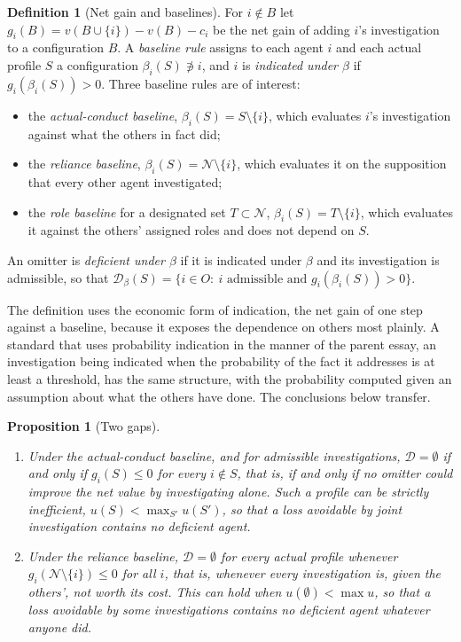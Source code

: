 \documentclass[11pt]{article}
\newcommand{\N}{\mathcal N}
\newcommand{\Dfc}{\mathcal D}
\theoremstyle{plain}
\newtheorem{proposition}{Proposition}
\theoremstyle{definition}
\newtheorem{definition}{Definition}
\begin{document}
\begin{definition}[Net gain and baselines]\label{def:baseline}
For $i\notin B$ let $g_i(B)=v(B\cup\{i\})-v(B)-c_i$ be the net gain of adding $i$'s investigation to a configuration $B$. A \emph{baseline rule} assigns to each agent $i$ and each actual profile $S$ a configuration $\beta_i(S)\not\ni i$, and $i$ is \emph{indicated under $\beta$} if $g_i(\beta_i(S))>0$. Three baseline rules are of interest:
\begin{itemize}[nosep]
\item the \emph{actual-conduct baseline}, $\beta_i(S)=S\setminus\{i\}$, which evaluates $i$'s investigation against what the others in fact did;
\item the \emph{reliance baseline}, $\beta_i(S)=\N\setminus\{i\}$, which evaluates it on the supposition that every other agent investigated;
\item the \emph{role baseline} for a designated set $T\subset\N$, $\beta_i(S)=T\setminus\{i\}$, which evaluates it against the others' assigned roles and does not depend on $S$.
\end{itemize}
An omitter is \emph{deficient under $\beta$} if it is indicated under $\beta$ and its investigation is admissible, so that $\Dfc_\beta(S)=\{i\in O:\ i\text{ admissible and }g_i(\beta_i(S))>0\}$.
\end{definition}

The definition uses the economic form of indication, the net gain of one step against a baseline, because it exposes the dependence on others most plainly. A standard that uses probability indication in the manner of the parent essay, an investigation being indicated when the probability of the fact it addresses is at least a threshold, has the same structure, with the probability computed given an assumption about what the others have done. The conclusions below transfer.

\begin{proposition}[Two gaps]\label{prop:gaps}
\begin{enumerate}[label=(\roman*),nosep]
\item Under the actual-conduct baseline, and for admissible investigations, $\Dfc=\emptyset$ if and only if $g_i(S)\le0$ for every $i\notin S$, that is, if and only if no omitter could improve the net value by investigating alone. Such a profile can be strictly inefficient, $u(S)<\max_{S'}u(S')$, so that a loss avoidable by joint investigation contains no deficient agent.
\item Under the reliance baseline, $\Dfc=\emptyset$ for every actual profile whenever $g_i(\N\setminus\{i\})\le0$ for all $i$, that is, whenever every investigation is, given the others', not worth its cost. This can hold when $u(\emptyset)<\max u$, so that a loss avoidable by some investigations contains no deficient agent whatever anyone did.
\end{enumerate}
\end{proposition}
\end{document}
